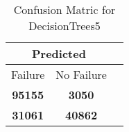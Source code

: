 \begin{table}[] 
	\caption{Confusion Matric for DecisionTrees5} 
	\label{Table: Prediction Accuracy-DMDDecisionTrees5OnlySunEKF-ignoreReflection-Reflection} 
	\centering 
	\begin{tabular} 
		{@{}ccc@{}} 
		\toprule 
		\multicolumn{2}{c}{\textbf{Predicted}}
		\\ \midrule 
		\multicolumn{1}{|c|}{Failure} & 
		\multicolumn{1}{c|}{No Failure}
		\\ \midrule 
		\multicolumn{1}{|c|}{\color{green}\textbf{95155}} & 
		\multicolumn{1}{c|}{\color{red}\textbf{3050}}
		\\ \midrule 
		\multicolumn{1}{|c|}{\color{red}\textbf{31061}} & 
		\multicolumn{1}{c|}{\color{green}\textbf{40862}}
		\\ \bottomrule 
	\end{tabular} 
\end{table} 